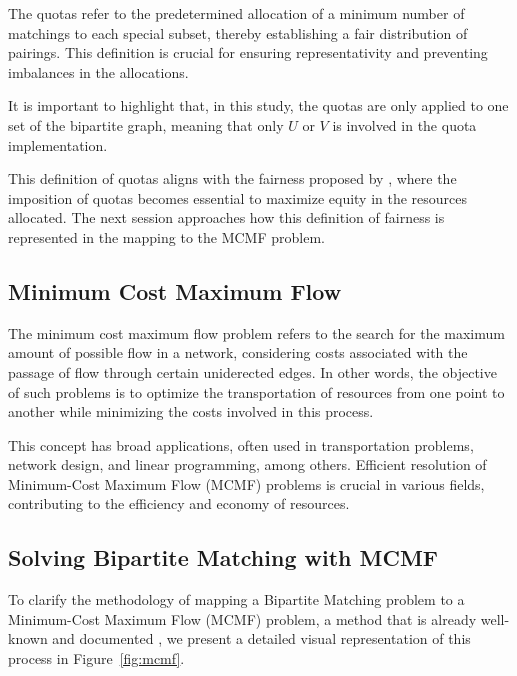            The quotas refer to the predetermined allocation of a minimum number of matchings to each special subset, thereby establishing a fair distribution of pairings. This definition is crucial for ensuring representativity and preventing imbalances in the allocations.
            
            It is important to highlight that, in this study, the quotas are only applied to one set of the bipartite graph, meaning that only $U$ or $V$ is involved in the quota implementation.
            
            This definition of quotas aligns with the fairness proposed by \cite{sankar}, where the imposition of quotas becomes essential to maximize equity in the resources allocated. The next session approaches how this definition of fairness is represented in the mapping to the MCMF problem. 
            
            \subsection{Minimum Cost Maximum Flow}
            
            The minimum cost maximum flow problem refers to the search for the maximum amount of possible flow in a network, considering costs associated with the passage of flow through certain uniderected edges\cite{korte2018combinatorial, ford1956maximal}. In other words, the objective of such problems is to optimize the transportation of resources from one point to another while minimizing the costs involved in this process.
            
            This concept has broad applications, often used in transportation problems, network design, and linear programming, among others. Efficient resolution of Minimum-Cost Maximum Flow (MCMF) problems is crucial in various fields, contributing to the efficiency and economy of resources.
            
            \subsection{Solving Bipartite Matching with MCMF}\label{subsubsec:resolucao-fluxo-matching}
            
            To clarify the methodology of mapping a Bipartite Matching problem to a Minimum-Cost Maximum Flow (MCMF) problem, a method that is already well-known and documented \cite{ahuja1993network, edmonds1972theoretical, tarjan1997dynamic}, we present a detailed visual representation of this process in Figure~\ref{fig:mcmf}.
            
